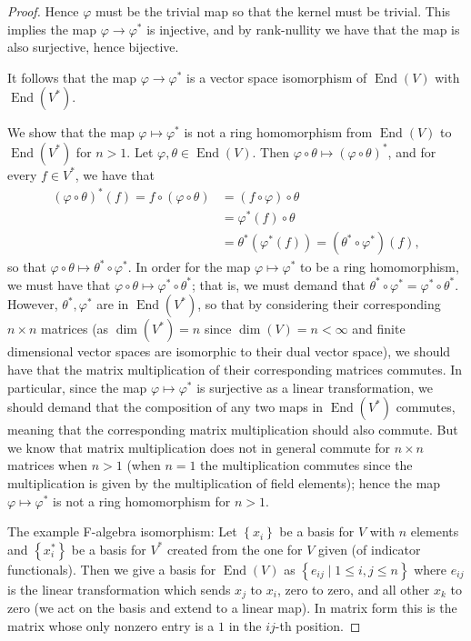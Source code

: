 \documentclass[11pt]{article}
\newcommand{\cbr}[1]{\left\{#1\right\}}
\DeclareMathOperator{\End}{End}
\begin{document}
\begin{enumerate}
\begin{proof}
        Hence $\varphi$ must be the trivial map so that the kernel must be trivial. This implies the map $\varphi\to\varphi^\ast$ is injective, and by rank-nullity we have that the map is also surjective, hence bijective. 
        
        It follows that the map $\varphi\to\varphi^\ast$ is a vector space isomorphism of $\End(V)$ with $\End(V^\ast)$.

        We show that the map $\varphi\mapsto \varphi^\ast$ is not a ring homomorphism from $\End(V)$ to $\End(V^\ast)$ for $n>1$. Let $\varphi,\theta\in \End(V)$. Then $\varphi\circ\theta\mapsto(\varphi\circ\theta)^\ast$, and for every $f\in V^\ast$, we have that \begin{align*}
            (\varphi\circ\theta)^\ast(f) = f\circ(\varphi\circ\theta) &= (f\circ\varphi)\circ\theta\\
            &= \varphi^\ast(f)\circ \theta\\
            &= \theta^\ast(\varphi^\ast(f)) = (\theta^\ast\circ\varphi^\ast)(f),
        \end{align*} so that $\varphi\circ\theta\mapsto \theta^\ast\circ\varphi^\ast$. In order for the map $\varphi\mapsto \varphi^\ast$ to be a ring homomorphism, we must have that $\varphi\circ\theta\mapsto \varphi^\ast\circ\theta^\ast$; that is, we must demand that $\theta^\ast\circ\varphi^\ast = \varphi^\ast\circ\theta^\ast$. However, $\theta^\ast,\varphi^\ast$ are in $\End(V^\ast)$, so that by considering their corresponding $n\times n$ matrices (as $\dim(V^\ast) = n$ since $\dim(V) = n<\infty$ and finite dimensional vector spaces are isomorphic to their dual vector space), we should have that the matrix multiplication of their corresponding matrices commutes. In particular, since the map $\varphi\mapsto \varphi^\ast$ is surjective as a linear transformation, we should demand that the composition of any two maps in $\End(V^\ast)$ commutes, meaning that the corresponding matrix multiplication should also commute. But we know that matrix multiplication does not in general commute for $n\times n$ matrices when $n>1$ (when $n = 1$ the multiplication commutes since the multiplication is given by the multiplication of field elements); hence the map $\varphi\mapsto \varphi^\ast$ is not a ring homomorphism for $n>1$.

        The example F-algebra isomorphism: Let $\cbr{x_i}$ be a basis for $V$ with $n$ elements and $\cbr{x_i^\ast}$ be a basis for $V^\ast$ created from the one for $V$ given (of indicator functionals). Then we give a basis for $\End(V)$ as $\cbr{e_{ij}\mid 1\leq i,j\leq n}$ where $e_{ij}$ is the linear transformation which sends $x_j$ to $x_i$, zero to zero, and all other $x_k$ to zero (we act on the basis and extend to a linear map). In matrix form this is the matrix whose only nonzero entry is a $1$ in the $ij$-th position.


\end{proof}
\end{enumerate}
\end{document}
